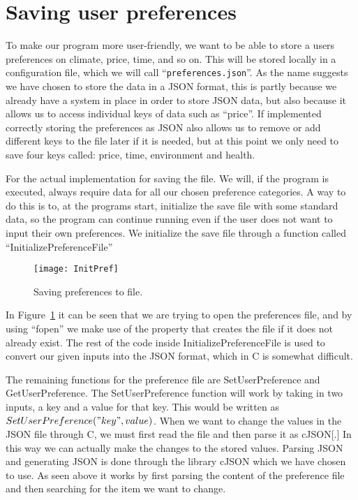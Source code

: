 \section{Saving user preferences}\label{sec:saving-user-preferences}

To make our program more user-friendly, we want to be able to store a users preferences on climate, price,
time, and so on.
This will be stored locally in a configuration file, which we will call
``\verb|preferences.json|''.
As the name suggests we have chosen to store the data in a JSON format, this is partly because we already have
a system in place in order to store JSON data, but also because it allows us to access individual keys of data such as
``price''.
If implemented correctly storing the preferences as JSON also allows us to remove or add different keys to the file
later if it is needed, but at this point we only need to save four keys called: price, time, environment and health.

For the actual implementation for saving the file.
We will, if the program is executed, always require data for all our chosen preference categories.
A way to do this is to, at the programs start, initialize the save file with some standard data, so the program can
continue running even if the user does not want to input their own preferences.
We initialize the save file through a function called ``InitializePreferenceFile''

\begin{figure}
    \centering
    \texttt{[image: InitPref]}
    \caption{Saving preferences to file.}
    \label{fig:figureInitSaveFile}
\end{figure}

In Figure~\ref{fig:figureInitSaveFile} it can be seen that we are trying to open the preferences file,
and by using ``fopen'' we make use of the property that creates the file if it does not already exist.
The rest of the code inside InitializePreferenceFile is used to convert our given inputs into the JSON format, which in
C is somewhat difficult.

The remaining functions for the preference file are SetUserPreference and GetUserPreference.
The SetUserPreference function will work by taking in two inputs, a key and a value for that key.
This would be written as \(SetUserPreference("key", value)\).
When we want to change the values in the JSON file through C, we must first read the file and then parse it as cJSON[.]
In this way we can actually make the changes to the stored values.
Parsing JSON and generating JSON is done through the library cJSON which we have chosen to use.
As seen above it works by first parsing the content of the preference file and then searching for the item we want to
change.

